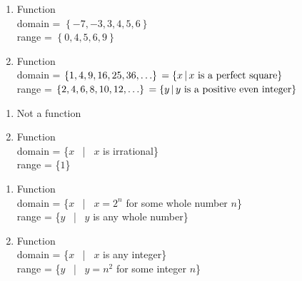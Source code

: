 \begin{multicols}{2}
\begin{enumerate}
\setcounter{enumi}{\value{HW}}

\item  Function \\ domain = $\left\{ -7, -3, 3, 4, 5, 6 \right\}$ \\ range = $\left\{ 0,4,5,6,9 \right\}$


\vfill

\columnbreak

\item  Function \\ domain =   $\left\{ 1, 4, 9, 16, 25, 36, \ldots \right\} \\ = \left\{ x \, | \, \text{$x$ is a perfect square} \right\}$ \\ range =  $\left\{ 2, 4, 6, 8, 10, 12, \ldots \right\} \\ = \left\{ y \, | \, \text{$y$ is a positive even integer} \right\}$

\setcounter{HW}{\value{enumi}}
\end{enumerate}
\end{multicols}

\begin{multicols}{2}
\begin{enumerate}
\setcounter{enumi}{\value{HW}}

\item  Not a function

\vfill

\columnbreak

\item Function \\ domain = \{$x$ \, | \, $x$ is irrational\} \\ range = \{$1$\}

\setcounter{HW}{\value{enumi}}
\end{enumerate}
\end{multicols}

\begin{multicols}{2}
\begin{enumerate}
\setcounter{enumi}{\value{HW}}

\item Function \\ domain = \{$x$ \, | \, $x = 2^{n}$ for some whole number $n$\} \\ range = \{$y$ \, | \, $y$ is any whole number\}

\vfill

\columnbreak

\item Function \\ domain = \{$x$ \, | \, $x$ is any integer\} \\ range = \{$y$ \, | \, $y = n^{2}$ for some integer $n$\}

\setcounter{HW}{\value{enumi}}
\end{enumerate}
\end{multicols}

